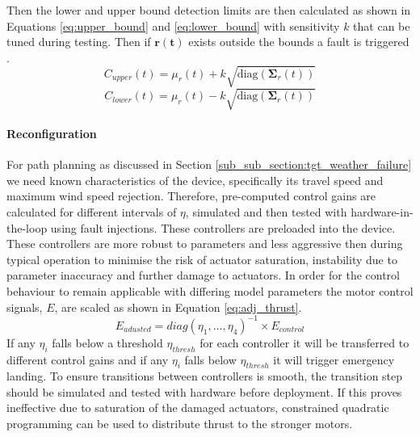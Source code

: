 Then the lower and upper bound detection limits are then calculated as shown in Equations \ref{eq:upper_bound} and \ref{eq:lower_bound} with sensitivity $k$ that can be tuned during testing. Then if $\mathbf{r(t)}$ exists outside the bounds a fault is triggered \cite{Perry2010}.
\begin{equation}\label{eq:upper_bound}
    C_{upper}(t) = \mu_r(t) + k \sqrt{\text{diag}(\mathbf{\Sigma}_r(t))} 
\end{equation}
\begin{equation}\label{eq:lower_bound}
    C_{lower}(t) =  \mu_r(t) - k \sqrt{\text{diag}(\mathbf{\Sigma}_r(t))}
\end{equation}

\paragraph{Reconfiguration}
For path planning as discussed in Section \ref{sub_sub_section:tgt_weather_failure} we need known characteristics of the device, specifically its travel speed and maximum wind speed rejection. Therefore, pre-computed control gains are calculated for different intervals of $\eta$, simulated and then tested with hardware-in-the-loop using fault injections. These controllers are preloaded into the device. These controllers are more robust to parameters and less aggressive then during typical operation to minimise the risk of actuator saturation, instability due to parameter inaccuracy and further damage to actuators. In order for the control behaviour to remain applicable with differing model parameters the motor control signals, $E$, are scaled as shown in Equation \ref{eq:adj_thrust}.
\begin{equation}\label{eq:adj_thrust}
    E_{adusted} = diag(\eta_1, \dots,\eta_4)^{-1}\times E_{control}
\end{equation}
If any $\eta_i$ falls below a threshold $\eta_{thresh}$ for each controller it will be transferred to different control gains and if any $\eta_i$ falls below $\eta_{thresh}$ it will trigger emergency landing. To ensure transitions between controllers is smooth, the transition step should be simulated and tested with hardware before deployment. If this proves ineffective due to saturation of the damaged actuators, constrained quadratic programming can be used \cite{JOHANSEN2013} to distribute thrust to the stronger motors.

